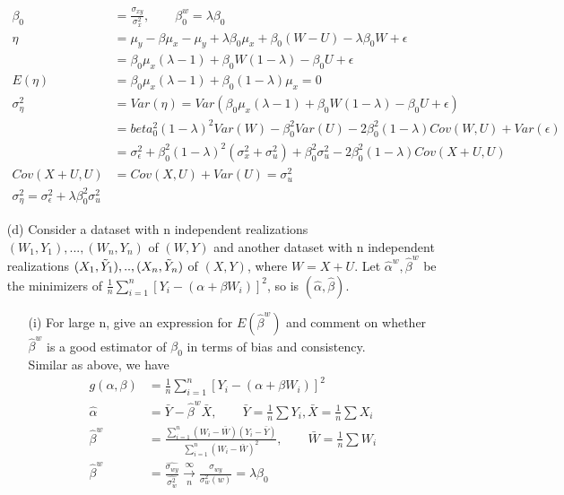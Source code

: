 \documentclass{article}
\begin{document}
\begin{itemize}
\begin{align*}
    \beta_0 &= \frac{\sigma_{xy}}{\sigma_x^2}, \qquad \beta_0^{w} = \lambda \beta_0\\
    \eta &=  \mu_y - \beta \mu_x -  \mu_y + \lambda \beta_0\mu_x + \beta_0 (W-U) -\lambda \beta_0 W + \epsilon\\
    &= \beta_0\mu_x(\lambda - 1) + \beta_0W (1-\lambda) -\beta_0 U + \epsilon\\
    E(\eta) &= \beta_0\mu_x(\lambda - 1)+ \beta_0 (1-\lambda) \mu_x =0\\
    \sigma_\eta^2 &= Var(\eta) = Var(\beta_0\mu_x(\lambda - 1) + \beta_0 W (1-\lambda) -\beta_0 U + \epsilon)\\
    &= beta_0^2(1-\lambda)^2Var(W) - \beta_0^2 Var(U) -2 \beta_0^2 (1-\lambda) Cov(W,U) + Var(\epsilon)\\
    &= \sigma_\epsilon^2 + \beta_0^2(1-\lambda)^2 (\sigma_x^2 + \sigma_u^2) + \beta_0^2\sigma_u^2 - 2\beta_0^2(1-\lambda) Cov(X+U, U)\\
    Cov(X+U, U) &= Cov(X,U) + Var(U) = \sigma_u^2\\
    \sigma_\eta^2 = \sigma_\epsilon^2 + \lambda\beta_0^2\sigma_u^2
    \end{align*}     
    \item[(d)] Consider a dataset with n independent realizations $(W_1, Y_1), ..., (W_n,Y_n)$ of $(W,Y)$ and another dataset with n independent realizations $(X_1, \Tilde{Y}_1),.. , (X_n, \Tilde{Y}_n)$ of $(X,Y)$, where $W= X+U$. Let $\hat{\alpha}^w, \hat{\beta}^w$ be the minimizers of $\frac{1}{n} \sum_{i=1}^{n} [Y_i - (\alpha+ \beta W_i)]^2$, so is $(\hat{\alpha}, \hat{\beta})$. \\
    \begin{itemize}
        \item [(i)] For large n, give an expression for $E(\hat{\beta}^w)$ and comment on whether $\hat{\beta}^w$ is a good estimator of $\beta_0$ in terms of bias and consistency.\\
        Similar as above, we have 
     \begin{align*}
    g(\alpha, \beta) &=\frac{1}{n} \sum_{i=1}^{n} [Y_i - (\alpha+ \beta W_i)]^2\\
    \hat{\alpha} &= \bar{Y} - \hat{\beta}^w \bar{X}, \qquad \bar{Y} = \frac{1}{n}\sum Y_i,\bar{X} = \frac{1}{n}\sum X_i \\
    \hat{\beta}^w &= \frac{\sum_{i=1}^n (W_i - \bar{W})(Y_i - \bar{Y})}{\sum_{i=1}^n (W_i-\bar{W})^2}, \qquad \bar{W} = \frac{1}{n} \sum W_i \\
    \hat{\beta}^w &= \frac{\hat{\sigma_{wy}}}{\hat{\sigma_w^2}} \xrightarrow[n]{ \infty} \frac{\sigma_{wy}}{\sigma_w^2(w)} = \lambda \beta_0\\

\end{align*}
\end{itemize}
\end{itemize}
\end{document}
